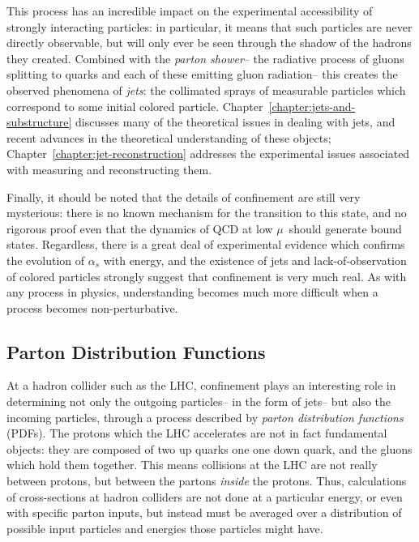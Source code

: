 This process has an incredible impact on the experimental accessibility of strongly interacting particles: in particular, it means that such particles are never directly observable, but will only ever be seen through the shadow of the hadrons they created. Combined with the \textit{parton shower}-- the radiative process of gluons splitting to quarks and each of these emitting gluon radiation-- this creates the observed phenomena of \textit{jets}: the collimated sprays of measurable particles which correspond to some initial colored particle. Chapter~\ref{chapter:jets-and-substructure} discusses many of the theoretical issues in dealing with jets, and recent advances in the theoretical understanding of these objects; Chapter~\ref{chapter:jet-reconstruction} addresses the experimental issues associated with measuring and reconstructing them.


Finally, it should be noted that the details of confinement are still very mysterious: there is no known mechanism for the transition to this state, and no rigorous proof even that the dynamics of QCD at low $\mu$~should generate bound states. Regardless, there is a great deal of experimental evidence which confirms the evolution of $\alpha_s$ with energy, and the existence of jets and lack-of-observation of colored particles strongly suggest that confinement is very much real. As with any process in physics, understanding becomes much more difficult when a process becomes non-perturbative.

\subsection{Parton Distribution Functions}

At a hadron collider such as the LHC, confinement plays an interesting role in determining not only the outgoing particles-- in the form of jets-- but also the incoming particles, through a process described by \textit{parton distribution functions} (PDFs). The protons which the LHC accelerates are not in fact fundamental objects: they are composed of two up quarks one one down quark, and the gluons which hold them together. This means collisions at the LHC are not really between protons, but between the partons \textit{inside} the protons. Thus, calculations of cross-sections at hadron colliders are not done at a particular energy, or even with specific parton inputs, but instead must be averaged over a distribution of possible input particles and energies those particles might have.

